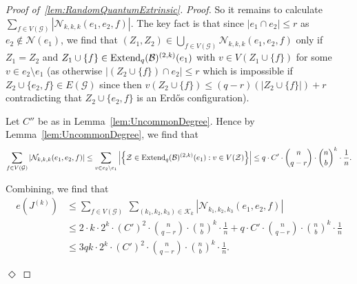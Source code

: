 \documentclass[11pt]{article}
\newcommand{\mc}[1]{\mathcal{#1}}
\newcounter{i}
\theoremstyle{plain}
\newenvironment{proofclaim}[1][]%
{\noindent \emph{Proof.} {}{#1}{}}{\hfill
	$\Diamond$\vspace{1em}}
\renewcommand{\theclaim}{\thetheorem.\arabic{claim}}
\newenvironment{lateproof}[1]
 {%
  \renewcommand{\theclaim}{\ref{#1}.\arabic{claim}}%
  \begin{proof}[Proof of~\cref{#1}]%
 }
 {\end{proof}}
\theoremstyle{plain} %
\theoremstyle{definition}
\begin{document}
\begin{lateproof}{lem:RandomQuantumExtrinsic}
\begin{proofclaim}
So it remains to calculate $\sum_{f\in V(\mc{G})} |\mc{N}_{k,k,k}(e_1,e_2,f)|$. The key fact is that since $|e_1 \cap e_2|\le r$ as $e_2\not\in \mc{N}(e_1)$, we find that $(Z_1,Z_2)\in \bigcup_{f\in V(\mc{G})} \mc{N}_{k,k,k}(e_1,e_2,f)$ only if $Z_1=Z_2$ and $Z_1\cup \{f\}\in {\rm Extend}_q(\mc{B})^{(2,k)}(e_1)$ with $v\in V(Z_1\cup \{f\})$ for some $v\in e_2\setminus e_1$ (as otherwise $|(Z_2\cup \{f\})\cap e_2|\le r$ which is impossible if $Z_2\cup \{e_2,f\} \in E(\mc{G})$ since then $v(Z_2\cup \{f\}) \le (q-r)(|Z_2\cup \{f\}|)+r$ contradicting that $Z_2\cup \{e_2,f\}$ is an Erd\H{o}s configuration).

Let $C''$ be as in Lemma~\ref{lem:UncommonDegree}. Hence by Lemma~\ref{lem:UncommonDegree}, we find that
$$\sum_{f\in V(\mc{G})} |\mc{N}_{k,k,k}(e_1,e_2,f)| \le \sum_{v\in e_2\setminus e_1} \left|\left\{\mc{Z}\in {\rm Extend}_q(\mc{B})^{(2,k)}(e_1): v\in V(\mc{Z})\right\}\right| \le q\cdot C'\cdot \binom{n}{q-r}\cdot \binom{n}{b}^k \cdot \frac{1}{n}.$$

Combining, we find that
\begin{align*}
e\left(J^{(k)}\right) &\le \sum_{f\in V(\mc{G})}~\sum_{(k_1,k_2,k_3)\in \mc{K}_k} |\mc{N}_{k_1,k_2,k_3}(e_1,e_2,f)| \\
&\le 2\cdot k\cdot 2^k \cdot (C')^2 \cdot \binom{n}{q-r}\cdot \binom{n}{b}^k \cdot \frac{1}{n}+ q\cdot C'\cdot \binom{n}{q-r}\cdot \binom{n}{b}^k \cdot \frac{1}{n} \\
&\le 3qk\cdot 2^k\cdot (C')^2 \cdot \binom{n}{q-r}\cdot \binom{n}{b}^k \cdot \frac{1}{n}.
\end{align*}


\end{proofclaim}
\end{lateproof}
\end{document}
